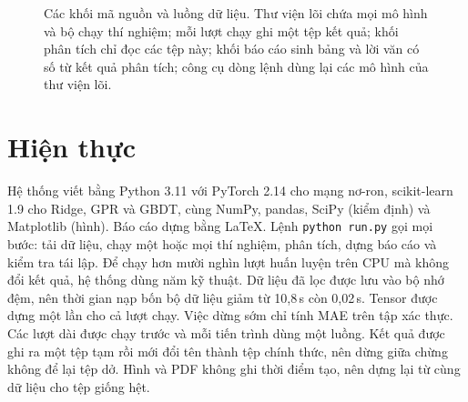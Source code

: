 \begin{figure}[!htbp]
\caption[Các khối mã nguồn và luồng dữ liệu]{Các khối mã nguồn và luồng dữ liệu. Thư viện lõi chứa mọi mô hình và bộ
chạy thí nghiệm; mỗi lượt chạy ghi một tệp kết quả; khối phân tích chỉ đọc các tệp này; khối báo cáo sinh bảng và lời văn
có số từ kết quả phân tích; công cụ dòng lệnh dùng lại các mô hình của thư viện lõi.}\label{fig:modules}
\end{figure}



\section{Hiện thực}\label{sec:hienthuc}

Hệ thống viết bằng Python 3.11 với PyTorch 2.14 cho mạng nơ-ron, scikit-learn 1.9 cho Ridge, GPR và GBDT, cùng NumPy,
pandas, SciPy (kiểm định) và Matplotlib (hình). Báo cáo dựng bằng \LaTeX. Lệnh \texttt{python run.py} gọi mọi bước: tải dữ
liệu, chạy một hoặc mọi thí nghiệm, phân tích, dựng báo cáo và kiểm tra tái lập. Để chạy hơn mười nghìn lượt huấn luyện
trên CPU mà không đổi kết quả, hệ thống dùng năm kỹ thuật. Dữ liệu đã lọc được lưu vào bộ nhớ đệm, nên thời gian nạp bốn
bộ dữ liệu giảm từ 10,8\,s còn 0,02\,s. Tensor được dựng một lần cho cả lượt chạy. Việc dừng sớm chỉ tính MAE trên tập xác
thực. Các lượt dài được chạy trước và mỗi tiến trình dùng một luồng. Kết quả được ghi ra một tệp tạm rồi mới đổi tên thành
tệp chính thức, nên dừng giữa chừng không để lại tệp dở. Hình và PDF không ghi thời điểm tạo, nên dựng lại từ cùng dữ liệu
cho tệp giống hệt.

